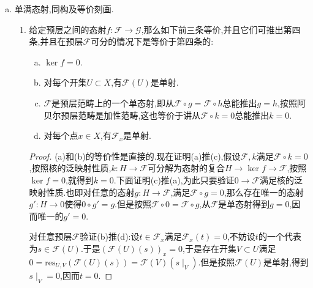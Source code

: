 \begin{enumerate}
\begin{enumerate}[(a)]
\begin{enumerate}[(1)]
\begin{proof}
				选取$t\in(\ker\varphi)_x$,那么有$x$的开邻域$U$和$s\in\mathscr{F}(U)$,使得$s_x=t$并且$\varphi(U)(s)=0$.于是有$\varphi_x(s_x)=0_x=0$,所以$t\in\ker(\varphi_x)$,这说明$(\ker\varphi)_x\subset\ker(\varphi_x)$.反过来任取$s_x\in\ker\varphi_x$,选取$s_x$的代表元$(s,V)$,记$t=\varphi(V)(s)$,那么$t_x=0$,所以存在$x$的足够小的开邻域$V\subset U$使得$t\mid V=0$.那么$\varphi(V)(s\mid V)=0$,这说明$s_x\in(\ker\varphi)_x$.
			\end{proof}
		\end{enumerate}
		\item 单满态射,同构及等价刻画.
		\begin{enumerate}[(1)]
			\item 给定预层之间的态射$f:\mathscr{F}\to\mathscr{G}$,那么如下前三条等价,并且它们可推出第四条,并且在预层$\mathscr{F}$可分的情况下是等价于第四条的:
			\begin{enumerate}[(a)]
				\item $\ker f=0$.
				\item 对每个开集$U\subset X$,有$\mathscr{F}(U)$是单射.
				\item $\mathscr{F}$是预层范畴上的一个单态射,即从$\mathscr{F}\circ g=\mathscr{F}\circ h$总能推出$g=h$,按照阿贝尔预层范畴是加性范畴,这也等价于讲从$\mathscr{F}\circ k=0$总能推出$k=0$.
				\item 对每个点$x\in X$,有$\mathscr{F}_x$是单射.
			\end{enumerate}
			\begin{proof}
				
				(a)和(b)的等价性是直接的.现在证明(a)推(c),假设$\mathscr{F},k$满足$\mathscr{F}\circ k=0$,按照核的泛映射性质,$k:H\to \mathscr{F}$可分解为态射的复合$H\to\ker f\to \mathscr{F}$,按照$\ker f=0$,就得到$k=0$.下面证明(c)推(a),为此只要验证$0\to \mathscr{F}$满足核的泛映射性质.也即对任意的态射$g:H\to \mathscr{F}$,满足$\mathscr{F}\circ g=0$,那么存在唯一的态射$g':H\to 0$使得$0\circ g'=g$.但是按照$\mathscr{F}\circ 0=\mathscr{F}\circ g$,从$\mathscr{F}$是单态射得到$g=0$,因而唯一的$g'=0$.
				
				对任意预层$\mathscr{F}$验证(b)推(d):设$t\in \mathscr{F}_x$满足$\mathscr{F}_x(t)=0$,不妨设$t$的一个代表为$s\in \mathscr{F}(U)$.于是$(\mathscr{F}(U)(s))_x=0$,于是存在开集$V\subset U$满足$0=\mathrm{res}_{U,V}(\mathscr{F}(U)(s))=\mathscr{F}(V)(s\mid_V)$.但是按照$\mathscr{F}(U)$是单射,得到$s\mid_V=0$,因而$t=0$.
				

\end{proof}
\end{enumerate}
\end{enumerate}
\end{enumerate}
